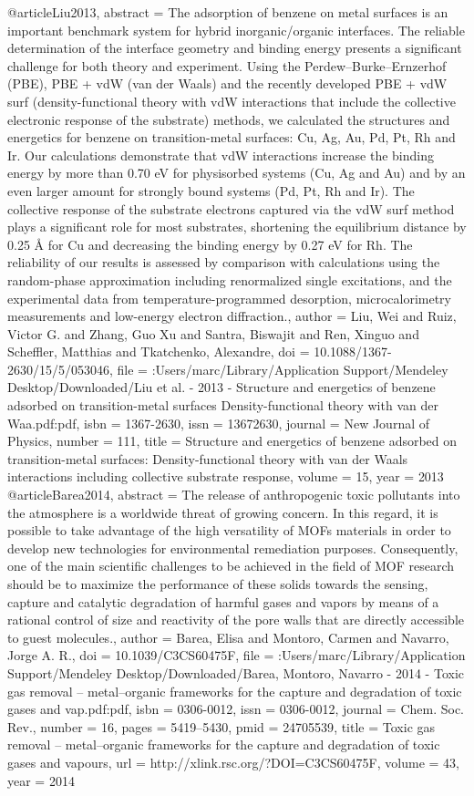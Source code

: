 @article{Liu2013,
abstract = {The adsorption of benzene on metal surfaces is an important benchmark system for hybrid inorganic/organic interfaces. The reliable determination of the interface geometry and binding energy presents a significant challenge for both theory and experiment. Using the Perdew–Burke–Ernzerhof (PBE), PBE + vdW (van der Waals) and the recently developed PBE + vdW surf (density-functional theory with vdW interactions that include the collective electronic response of the substrate) methods, we calculated the structures and energetics for benzene on transition-metal surfaces: Cu, Ag, Au, Pd, Pt, Rh and Ir. Our calculations demonstrate that vdW interactions increase the binding energy by more than 0.70 eV for physisorbed systems (Cu, Ag and Au) and by an even larger amount for strongly bound systems (Pd, Pt, Rh and Ir). The collective response of the substrate electrons captured via the vdW surf method plays a significant role for most substrates, shortening the equilibrium distance by 0.25 {\AA} for Cu and decreasing the binding energy by 0.27 eV for Rh. The reliability of our results is assessed by comparison with calculations using the random-phase approximation including renormalized single excitations, and the experimental data from temperature-programmed desorption, microcalorimetry measurements and low-energy electron diffraction.},
author = {Liu, Wei and Ruiz, Victor G. and Zhang, Guo Xu and Santra, Biswajit and Ren, Xinguo and Scheffler, Matthias and Tkatchenko, Alexandre},
doi = {10.1088/1367-2630/15/5/053046},
file = {:Users/marc/Library/Application Support/Mendeley Desktop/Downloaded/Liu et al. - 2013 - Structure and energetics of benzene adsorbed on transition-metal surfaces Density-functional theory with van der Waa.pdf:pdf},
isbn = {1367-2630},
issn = {13672630},
journal = {New Journal of Physics},
number = {111},
title = {{Structure and energetics of benzene adsorbed on transition-metal surfaces: Density-functional theory with van der Waals interactions including collective substrate response}},
volume = {15},
year = {2013}
}
@article{Barea2014,
abstract = {The release of anthropogenic toxic pollutants into the atmosphere is a worldwide threat of growing concern. In this regard, it is possible to take advantage of the high versatility of MOFs materials in order to develop new technologies for environmental remediation purposes. Consequently, one of the main scientific challenges to be achieved in the field of MOF research should be to maximize the performance of these solids towards the sensing, capture and catalytic degradation of harmful gases and vapors by means of a rational control of size and reactivity of the pore walls that are directly accessible to guest molecules.},
author = {Barea, Elisa and Montoro, Carmen and Navarro, Jorge A. R.},
doi = {10.1039/C3CS60475F},
file = {:Users/marc/Library/Application Support/Mendeley Desktop/Downloaded/Barea, Montoro, Navarro - 2014 - Toxic gas removal – metal–organic frameworks for the capture and degradation of toxic gases and vap.pdf:pdf},
isbn = {0306-0012},
issn = {0306-0012},
journal = {Chem. Soc. Rev.},
number = {16},
pages = {5419--5430},
pmid = {24705539},
title = {{Toxic gas removal – metal–organic frameworks for the capture and degradation of toxic gases and vapours}},
url = {http://xlink.rsc.org/?DOI=C3CS60475F},
volume = {43},
year = {2014}
}
